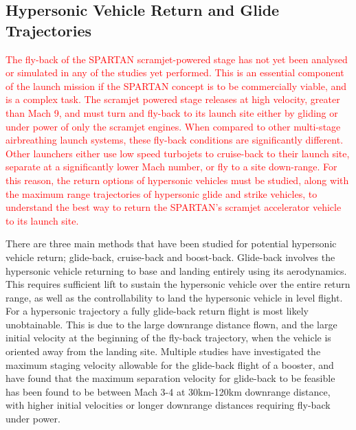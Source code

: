 
\subsection{Hypersonic Vehicle Return and Glide Trajectories}






\textcolor{red}{
The fly-back of the SPARTAN scramjet-powered stage has not yet been analysed or simulated in any of the studies yet performed.  
This is an essential component of the launch mission if the SPARTAN concept is to be commercially viable, and is a complex task. The scramjet powered stage releases at high velocity, greater than Mach 9, and must turn and fly-back to its launch site either by gliding or under power of only the scramjet engines. When compared to other multi-stage airbreathing launch systems, these fly-back conditions are significantly different. Other launchers either use low speed turbojets to cruise-back to their launch site, separate at a significantly lower Mach number, or fly to a site down-range. For this reason, the return options of hypersonic vehicles must be studied, along with the maximum range trajectories of hypersonic glide and strike vehicles, to understand the best way to return the SPARTAN's scramjet accelerator vehicle to its launch site. 
}

There are three main methods that have been studied for potential hypersonic vehicle return; glide-back, cruise-back and boost-back. Glide-back involves the hypersonic vehicle returning to base and landing entirely using its aerodynamics. This requires sufficient lift to sustain the hypersonic vehicle over the entire return range, as well as the controllability to land the hypersonic vehicle in level flight. 
For a hypersonic trajectory a fully glide-back return flight is most likely unobtainable. This is due to the large downrange distance flown, and the large initial velocity at the beginning of the fly-back trajectory, when the vehicle is oriented away from the landing site. Multiple studies have investigated the maximum staging velocity allowable for the glide-back flight of a booster, and have found that the maximum separation velocity for glide-back to be feasible has been found to be between Mach 3-4 at 30km-120km downrange distance, with higher initial velocities or longer downrange distances requiring fly-back under power\cite{Hellman,Tetlow1992}.

